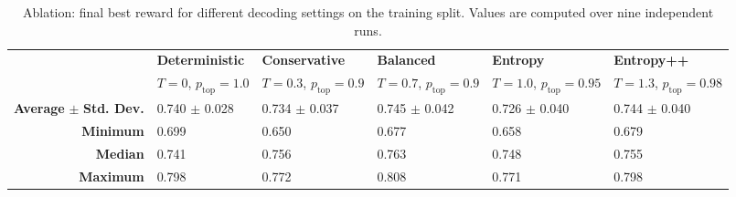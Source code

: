 \documentclass[sigconf,pbalance]{acmart_modified}
\begin{document}
\begin{table}[H]
    \caption{Ablation: final best reward for different decoding settings on the training split. Values are computed over nine independent runs.}
    \label{tab:decoding}
    \vspace{-0.3cm}
    \centering
    \small
    \renewcommand{\arraystretch}{1.15}
    \setlength{\tabcolsep}{4pt}
    \begin{tabular}{rw{c}{1.9cm}w{c}{1.9cm}w{c}{1.9cm}w{c}{1.9cm}w{c}{1.9cm}}
    \toprule
    & \textbf{Deterministic} & \textbf{Conservative} & \textbf{Balanced} & \textbf{Entropy} & \textbf{Entropy++} \\
    & {\scriptsize $T = 0$, $p_\text{top} = 1.0$}
    & {\scriptsize $T = 0.3$, $p_\text{top} = 0.9$}
    & {\scriptsize $T = 0.7$, $p_\text{top} = 0.9$}
    & {\scriptsize $T = 1.0$, $p_\text{top} = 0.95$}
    & {\scriptsize $T = 1.3$, $p_\text{top} = 0.98$}\\
    \midrule
    \textbf{Average} $\pm$ \textbf{Std. Dev.}
      &    0.740 $\pm$ 0.028
      &   0.734 $\pm$ 0.037
      &  0.745 $\pm$ 0.042
      &   0.726 $\pm$ 0.040
      &    0.744 $\pm$ 0.040 \\
    \textbf{Minimum}
      &   0.699
      &  0.650
      &   0.677
      &   0.658
      &   0.679 \\
    \textbf{Median}
      &    0.741
      &  0.756
      &  0.763
      &   0.748
      &  0.755 \\
    \textbf{Maximum}
      &   0.798
      &   0.772
      &  0.808
      &   0.771
      &   0.798 \\
    \bottomrule
    \end{tabular}
\end{table}
\end{document}

